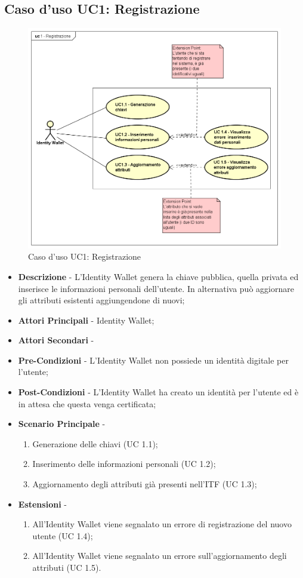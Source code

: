 \subsection{Caso d'uso UC1: Registrazione}
\begin{figure}[h]
	\centering
	\includegraphics[scale=0.50]{immagini/usecase/UC1_Registrazione}
	\caption{Caso d'uso UC1: Registrazione}
\end{figure}
\begin{itemize}
	\item \textbf{Descrizione} - L'Identity Wallet genera la chiave pubblica, quella privata ed inserisce le informazioni personali dell'utente. In alternativa può aggiornare gli attributi esistenti aggiungendone di nuovi;
	\item \textbf{Attori Principali} - Identity Wallet;
	\item \textbf{Attori Secondari} -
	\item \textbf{Pre-Condizioni} - L'Identity Wallet non possiede un identità digitale per l'utente;
	\item \textbf{Post-Condizioni} - L'Identity Wallet ha creato un identità per l'utente ed è in attesa che questa venga certificata;
	\item \textbf{Scenario Principale} - 
	\begin{enumerate}
		\item Generazione delle chiavi (UC 1.1);
		\item Inserimento delle informazioni personali (UC 1.2);
		\item Aggiornamento degli attributi già presenti nell'\gls{ITF} (UC 1.3);
	\end{enumerate}
	\item \textbf{Estensioni} -
	\begin{enumerate}
		\item All'Identity Wallet viene segnalato un errore di registrazione del nuovo utente (UC 1.4);
		\item All'Identity Wallet viene segnalato un errore sull'aggiornamento degli attributi (UC 1.5).
	\end{enumerate}
\end{itemize}
